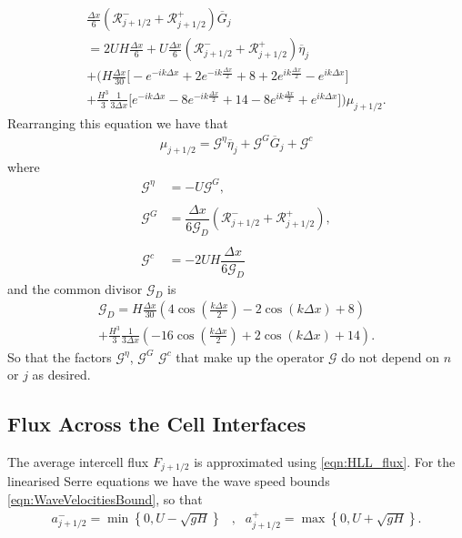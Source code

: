 \begin{multline*}
\frac{\Delta x}{6} \left(\mathcal{R}^-_{j +1/2} + \mathcal{R}^+_{j +1/2} \right) \overline{G}_j  \\
=2UH\frac{\Delta x}{6}   + U\frac{\Delta x}{6} \left(\mathcal{R}^-_{j +1/2} + \mathcal{R}^+_{j +1/2} \right) \overline{\eta}_j\\ +   \Bigg(H\frac{\Delta x}{30} \Bigg[ -e^{-ik\Delta x } +  2 e^{-ik\frac{\Delta x}{2}}  + 8 + 2 e^{ik\frac{\Delta x}{2}} - e^{ik{\Delta x}}  \Bigg]   \\ + \frac{H^3 }{3}\frac{1 }{3\Delta x} \Bigg[  e^{-ik{\Delta x}} -8e^{-ik\frac{\Delta x}{2}} + 14  - 8 e^{ik\frac{\Delta x}{2}} + e^{ik{\Delta x}}  \Bigg]    \Bigg) \mu_{j+1/2}. 
\end{multline*}
Rearranging this equation we have that
\begin{align}
\label{eqn:2ndFEMutoG}
\mu_{j+1/2} =  \mathcal{G}^{\eta} \overline{\eta}_{j} + \mathcal{G}^G \overline{G}_{j} + \mathcal{G}^c 
\end{align}
where
\begin{align*}
\mathcal{G}^\eta &=  -U\mathcal{G}^G, \\ \\
\mathcal{G}^G &= \dfrac{\Delta x}{6\mathcal{G}_D } \left(\mathcal{R}^-_{j +1/2} + \mathcal{R}^+_{j +1/2} \right), \\ \\
\mathcal{G}^c &=  -2UH \dfrac{\Delta x}{6\mathcal{G}_D }
\end{align*}
and the common divisor $\mathcal{G}_D$ is
\begin{multline*}
\mathcal{G}_D = H\frac{\Delta x}{30} \left(4\cos\left(\frac{k \Delta x}{2}\right) - 2\cos\left({k \Delta x}\right) + 8\right) \\ + \frac{H^3 }{3}\frac{1}{3\Delta x}\left(-16\cos\left(\frac{k\Delta x}{2}\right) + 2 \cos\left(k \Delta x\right) + 14\right).
\end{multline*}
So that the factors $\mathcal{G}^\eta$, $\mathcal{G}^G$ $\mathcal{G}^c$ that make up the operator $\mathcal{G}$ do not depend on $n$ or $j$ as desired.

\subsection{Flux Across the Cell Interfaces}
The average intercell flux $F_{j+1/2}$ is approximated using \eqref{eqn:HLL_flux}. For the linearised Serre equations we have the wave speed bounds \eqref{eqn:WaveVelocitiesBound}, so that
\begin{align}
a^-_{j+ 1/2} = \min \left\lbrace 0,  U - \sqrt{g H} \right \rbrace&, &a^+_{j+ 1/2} =  \max \left\lbrace 0, U + \sqrt{g H} \right \rbrace .
\label{eqn:wavespeedboundslinSerre}
\end{align}

